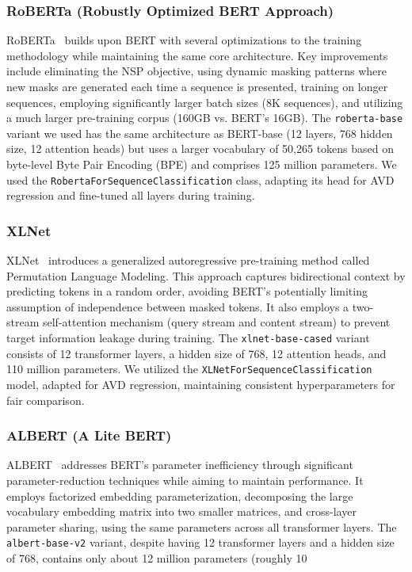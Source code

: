 \documentclass[12pt]{article}
\begin{document}
\subsubsection{RoBERTa (Robustly Optimized BERT Approach)}
RoBERTa~\cite{liu2019roberta} builds upon BERT with several optimizations to the training methodology while maintaining the same core architecture. Key improvements include eliminating the NSP objective, using dynamic masking patterns where new masks are generated each time a sequence is presented, training on longer sequences, employing significantly larger batch sizes (8K sequences), and utilizing a much larger pre-training corpus (160GB vs. BERT's 16GB). The \texttt{roberta-base} variant we used has the same architecture as BERT-base (12 layers, 768 hidden size, 12 attention heads) but uses a larger vocabulary of 50,265 tokens based on byte-level Byte Pair Encoding (BPE) and comprises 125 million parameters. We used the \texttt{RobertaForSequenceClassification} class, adapting its head for AVD regression and fine-tuned all layers during training.

\subsubsection{XLNet}
XLNet~\cite{yang2019xlnet} introduces a generalized autoregressive pre-training method called Permutation Language Modeling. This approach captures bidirectional context by predicting tokens in a random order, avoiding BERT's potentially limiting assumption of independence between masked tokens. It also employs a two-stream self-attention mechanism (query stream and content stream) to prevent target information leakage during training. The \texttt{xlnet-base-cased} variant consists of 12 transformer layers, a hidden size of 768, 12 attention heads, and 110 million parameters. We utilized the \texttt{XLNetForSequenceClassification} model, adapted for AVD regression, maintaining consistent hyperparameters for fair comparison.

\subsubsection{ALBERT (A Lite BERT)}
ALBERT~\cite{lan2019albert} addresses BERT's parameter inefficiency through significant parameter-reduction techniques while aiming to maintain performance. It employs factorized embedding parameterization, decomposing the large vocabulary embedding matrix into two smaller matrices, and cross-layer parameter sharing, using the same parameters across all transformer layers. The \texttt{albert-base-v2} variant, despite having 12 transformer layers and a hidden size of 768, contains only about 12 million parameters (roughly 10%
\end{document}
